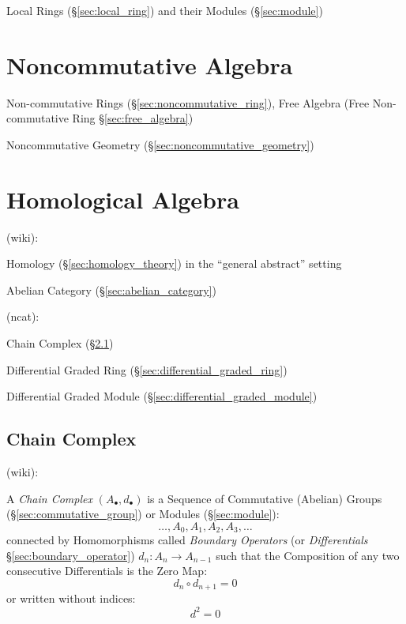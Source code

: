 Local Rings (\S\ref{sec:local_ring}) and their Modules (\S\ref{sec:module})



\section{Noncommutative Algebra}\label{sec:noncommutative_algebra}

Non-commutative Rings (\S\ref{sec:noncommutative_ring}),
Free Algebra (Free Non-commutative Ring \S\ref{sec:free_algebra})

Noncommutative Geometry (\S\ref{sec:noncommutative_geometry})



\section{Homological Algebra}\label{sec:homological_algebra}

(wiki):

Homology (\S\ref{sec:homology_theory}) in the ``general abstract'' setting

Abelian Category (\S\ref{sec:abelian_category})

(ncat):

Chain Complex (\S\ref{sec:chain_complex})

Differential Graded Ring (\S\ref{sec:differential_graded_ring})

Differential Graded Module (\S\ref{sec:differential_graded_module})



\subsection{Chain Complex}\label{sec:chain_complex}

(wiki):

A \emph{Chain Complex} $(A_\bullet, d_\bullet)$ is a Sequence of Commutative
(Abelian) Groups (\S\ref{sec:commutative_group}) or Modules
(\S\ref{sec:module}):
\[
  \ldots, A_0, A_1, A_2, A_3, \ldots
\]
connected by Homomorphisms called \emph{Boundary Operators} (or
\emph{Differentials} \S\ref{sec:boundary_operator}) $d_n : A_n \rightarrow
A_{n-1}$ such that the Composition of any two consecutive Differentials is
the Zero Map:
\[
  d_n \circ d_{n+1} = 0
\]
or written without indices:
\[
  d^2 = 0
\]

